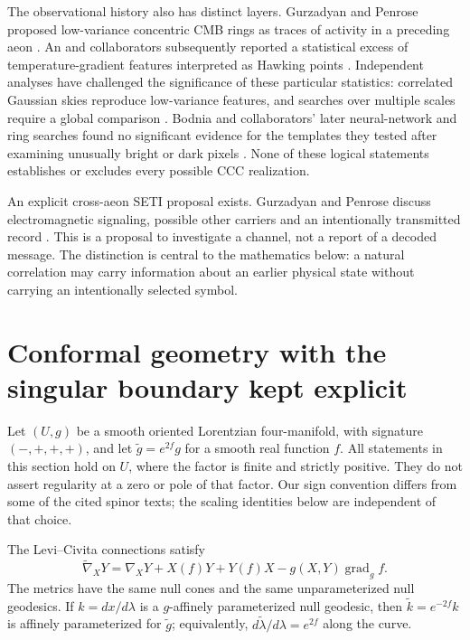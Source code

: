 The observational history also has distinct layers. Gurzadyan and Penrose
proposed low-variance concentric CMB rings as traces of activity in a preceding
aeon \citep[pp.~1--6]{CCGurzadyanPenrose2010}. An and collaborators subsequently
reported a statistical excess of temperature-gradient features interpreted as
Hawking points \citep[Secs.~3--5]{CCAnEtAl2020}. Independent analyses have
challenged the significance of these particular statistics: correlated
Gaussian skies reproduce low-variance features, and searches over multiple
scales require a global comparison
\citep[pp.~1--4]{CCMossScottZibin2011}
\citep[Secs.~2--4]{CCJowScott2020}. Bodnia and collaborators' later neural-network
and ring searches found no significant evidence for the templates they tested
after examining unusually bright or dark pixels
\citep[Secs.~2--4]{CCBodniaEtAl2024}. None of these logical statements establishes
or excludes every possible CCC realization.

An explicit cross-aeon SETI proposal exists. Gurzadyan and Penrose discuss
electromagnetic signaling, possible other carriers and an intentionally
transmitted record \citep[Sec.~2, pp.~2--4]{CCGurzadyanPenrose2016}. This is a
proposal to investigate a channel, not a report of a decoded message. The
distinction is central to the mathematics below: a natural correlation may
carry information about an earlier physical state without carrying an
intentionally selected symbol.

\section{Conformal geometry with the singular boundary kept explicit}

Let $(U,g)$ be a smooth oriented Lorentzian four-manifold, with signature
$(-,+,+,+)$, and let $\widetilde g=e^{2f}g$ for a smooth real function $f$.
All statements in this section hold on $U$, where the factor is finite and
strictly positive. They do not assert regularity at a zero or pole of that
factor. Our sign convention differs from some of the cited spinor texts;
the scaling identities below are independent of that choice.

\begin{proposition}
\label{prop:cc-null}
The Levi--Civita connections satisfy
\begin{equation}
 \widetilde\nabla_XY=\nabla_XY+X(f)Y+Y(f)X-g(X,Y)\operatorname{grad}_g f.
 \label{eq:cc-connection}
\end{equation}
The metrics have the same null cones and the same unparameterized null
geodesics. If $k=dx/d\lambda$ is a $g$-affinely parameterized null geodesic,
then $\widetilde k=e^{-2f}k$ is affinely parameterized for $\widetilde g$;
equivalently, $d\widetilde\lambda/d\lambda=e^{2f}$ along the curve.
\end{proposition}


